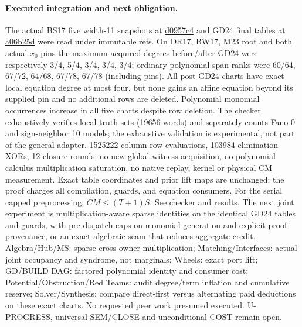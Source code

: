 \documentclass[11pt]{article}
\begin{document}
\paragraph{Executed integration and next obligation.}
The actual BS17 five width-11 snapshots at \href{https://github.com/j15marti/pnp/commit/d0957c4e012049409c644b915f52c3483e7bee6d}{d0957c4} and GD24 final tables at \href{https://github.com/j15marti/pnp/commit/a06b25dad6c0d06f689a201825e2d267269cf181}{a06b25d} were read under immutable refs. On DR17, BW17, M23 root and both actual $x_0$ pins the maximum acquired degrees before/after GD24 were respectively 3/4, 5/4, 3/4, 3/4, 3/4; ordinary polynomial span ranks were 60/64, 67/72, 64/68, 67/78, 67/78 (including pins). All post-GD24 charts have exact local equation degree at most four, but none gains an affine equation beyond its supplied pin and no additional rows are deleted. Polynomial monomial occurrences increase in all five charts despite row deletion. The checker exhaustively verifies local truth sets (19656 words) and separately counts Fano 0 and sign-neighbor 10 models; the exhaustive validation is experimental, not part of the general adapter. 1525222 column-row evaluations, 103984 elimination XORs, 12 closure rounds; no new global witness acquisition, no polynomial calculus multiplication saturation, no native replay, kernel or physical CM measurement. Exact table coordinates and prior lift maps are unchanged; the proof charges all compilation, guards, and equation consumers. For the serial capped preprocessing, $CM\le(T+1)S$. See \href{https://github.com/j15marti/pnp/commit/5f856cd081bfe8dc24913fd34a4527a233bf470e}{checker} and \href{https://github.com/j15marti/pnp/commit/cdbab38d33f844b1208144c76d4612244735cb93}{results}.
The next joint experiment is multiplication-aware sparse identities on the identical GD24 tables and guards, with pre-dispatch caps on monomial generation and explicit proof provenance, or an exact algebraic seam that reduces aggregate credit. Algebra/Hub/MS: sparse cross-owner multiplication; Matching/Interfaces: actual joint occupancy and syndrome, not marginals; Wheels: exact port lift; GD/BUILD DAG: factored polynomial identity and consumer cost; Potential/Obstruction/Red Teams: audit degree/term inflation and cumulative reserve; Solver/Synthesis: compare direct-first versus alternating paid deductions on these exact charts. No requested peer work presumed executed. U-PROGRESS, universal SEM/CLOSE and unconditional COST remain open.
\end{document}

